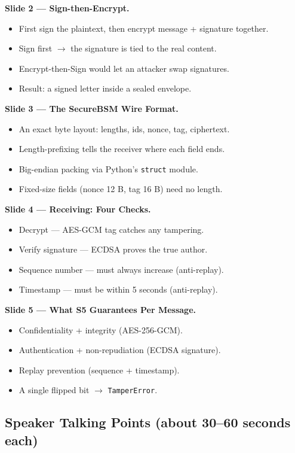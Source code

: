 \documentclass[11pt,a4paper]{report}
\begin{document}
\textbf{Slide 2 --- Sign-then-Encrypt.}
\begin{itemize}
  \item First sign the plaintext, then encrypt message + signature together.
  \item Sign first $\to$ the signature is tied to the real content.
  \item Encrypt-then-Sign would let an attacker swap signatures.
  \item Result: a signed letter inside a sealed envelope.
\end{itemize}

\textbf{Slide 3 --- The SecureBSM Wire Format.}
\begin{itemize}
  \item An exact byte layout: lengths, ids, nonce, tag, ciphertext.
  \item Length-prefixing tells the receiver where each field ends.
  \item Big-endian packing via Python's \texttt{struct} module.
  \item Fixed-size fields (nonce 12 B, tag 16 B) need no length.
\end{itemize}

\textbf{Slide 4 --- Receiving: Four Checks.}
\begin{itemize}
  \item Decrypt --- AES-GCM tag catches any tampering.
  \item Verify signature --- ECDSA proves the true author.
  \item Sequence number --- must always increase (anti-replay).
  \item Timestamp --- must be within 5 seconds (anti-replay).
\end{itemize}

\textbf{Slide 5 --- What S5 Guarantees Per Message.}
\begin{itemize}
  \item Confidentiality + integrity (AES-256-GCM).
  \item Authentication + non-repudiation (ECDSA signature).
  \item Replay prevention (sequence + timestamp).
  \item A single flipped bit $\to$ \texttt{TamperError}.
\end{itemize}

\subsection{Speaker Talking Points (about 30--60 seconds each)}
\end{document}
